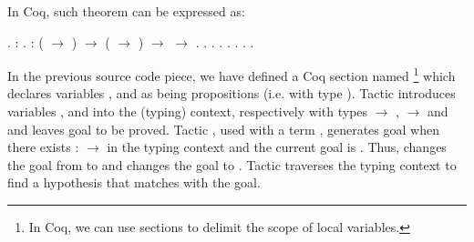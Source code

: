 In Coq, such theorem can be expressed as:
 \begin{coqdoccode}
\coqdocemptyline
\coqdocnoindent
{} .\coqdoceol
\coqdocindent{1.50em}
    : .\coqdoceol
\coqdocindent{1.50em}
  : ( \ensuremath{\rightarrow} ) \ensuremath{\rightarrow} ( \ensuremath{\rightarrow} ) \ensuremath{\rightarrow}  \ensuremath{\rightarrow} .\coqdoceol
\coqdocindent{1.50em}
.\coqdoceol
\coqdocindent{3.50em}
   .  .  . .\coqdoceol
\coqdocindent{1.50em}
.\coqdoceol
\coqdocnoindent
{} .\coqdoceol
\coqdocemptyline
\end{coqdoccode}
In the previous source code piece, we have defined a Coq section named
\footnote{In Coq, we can use sections to delimit the
  scope of local variables.} which declares variables ,
 and  as being propositions (i.e. with type
). Tactic  introduces variables
,  and  into the (typing) context,
respectively with types  \ensuremath{\rightarrow} ,  \ensuremath{\rightarrow}  and
 and leaves goal  to be proved. Tactic
, used with a term , generates goal 
when there exists :  \ensuremath{\rightarrow}  in the typing context and the
current goal is . Thus,   changes the goal
from  to  and   changes the goal to
. Tactic  traverses the typing context to
find a hypothesis that matches with the goal.


